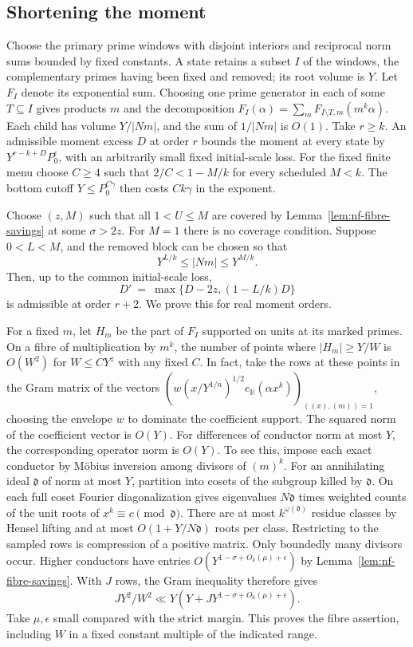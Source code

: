 \documentclass[11pt,letterpaper]{article}
\theoremstyle{definition}
\numberwithin{equation}{section}
\begin{document}
\subsection{Shortening the moment}
Choose the primary prime windows with disjoint interiors and
reciprocal norm sums bounded by fixed constants. A state retains a
subset $I$ of the windows, the complementary primes having been fixed
and removed; its root volume is $Y$. Let $F_I$ denote its exponential
sum. Choosing one prime generator in each of some $T\subseteq I$
gives products $m$ and the decomposition
$F_I(\alpha)=\sum_m F_{I\setminus T,m}(m^k\alpha)$.
Each child has volume $Y/|Nm|$, and the sum of $1/|Nm|$ is $O(1)$.
Take $r\ge k$. An admissible moment excess $D$ at order $r$ bounds
the moment at every state by $Y^{r-k+D}P_0^\epsilon$, with an
arbitrarily small fixed initial-scale loss. For the fixed finite menu choose $C\ge4$ such that
$2/C<1-M/k$ for every scheduled $M<k$. The bottom cutoff
$Y\le P_0^{C\gamma}$ then costs $Ck\gamma$ in the exponent.

Choose $(z,M)$ such that all $1<U\le M$ are covered by
Lemma~\ref{lem:nf-fibre-savings} at some $\sigma>2z$. For $M=1$
there is no coverage condition. Suppose $0<L<M$, and the removed
block can be chosen so that
\[
            Y^{L/k}\le |Nm|\le Y^{M/k}.
\]
Then, up to the common initial-scale loss,
\begin{equation}\label{eq:nf-short}
       D'\ =\ \max\{D-2z,(1-L/k)D\}
\end{equation}
is admissible at order $r+2$. We prove this for real moment orders.

For a fixed $m$, let $H_m$ be the part of $F_I$ supported on units
at its marked primes. On a fibre of multiplication by $m^k$, the
number of points where $|H_m|\ge Y/W$ is $O(W^2)$ for
$W\le C Y^z$ with any fixed $C$. In fact, take the rows at these
points in the Gram matrix of the vectors
$(w(x/Y^{1/n})^{1/2}e_{\mathbb K}(\alpha x^k))_{((x),(m))=1}$,
choosing the envelope $w$ to dominate the coefficient support.
The squared norm of the coefficient vector is $O(Y)$. For
differences of conductor norm at most $Y$, the corresponding
operator norm is $O(Y)$. To see this, impose each exact conductor
by M\"obius inversion among divisors of $(m)^k$. For an annihilating
ideal $\mathfrak d$ of norm at most $Y$, partition into cosets of
the subgroup killed by $\mathfrak d$. On each full coset Fourier
diagonalization gives eigenvalues $N\mathfrak d$ times weighted
counts of the unit roots of $x^k\equiv c\pmod{\mathfrak d}$.
There are at most $k^{\omega(\mathfrak d)}$ residue classes by
Hensel lifting and at most $O(1+Y/N\mathfrak d)$ roots per
class. Restricting to the sampled rows is compression of a positive
matrix. Only boundedly many divisors occur. Higher conductors have
entries $O(Y^{1-\sigma+O_k(\mu)+\epsilon})$ by
Lemma~\ref{lem:nf-fibre-savings}. With $J$ rows, the Gram inequality
therefore gives
\[
 JY^2/W^2\ll Y(Y+JY^{1-\sigma+O_k(\mu)+\epsilon}).
\]
Take $\mu,\epsilon$ small compared with the strict margin. This
proves the fibre assertion, including $W$ in a fixed constant
multiple of the indicated range.
\end{document}
